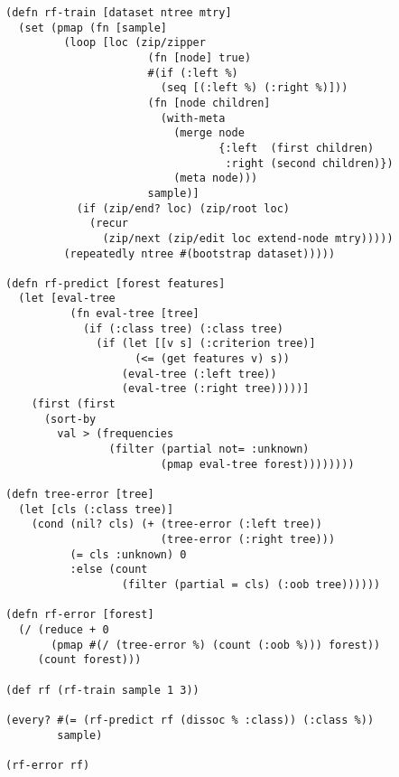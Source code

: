 \documentclass[a4paper,man,12pt,apacite,floatsintext,draftfirst]{apa6} %
\begin{document}
\begin{framed}
\begin{verbatim}
(defn rf-train [dataset ntree mtry]
  (set (pmap (fn [sample]
         (loop [loc (zip/zipper
                      (fn [node] true)
                      #(if (:left %)
                        (seq [(:left %) (:right %)]))
                      (fn [node children]
                        (with-meta
                          (merge node
                                 {:left  (first children)
                                  :right (second children)})
                          (meta node)))
                      sample)]
           (if (zip/end? loc) (zip/root loc)
             (recur
               (zip/next (zip/edit loc extend-node mtry)))))
         (repeatedly ntree #(bootstrap dataset)))))

(defn rf-predict [forest features]
  (let [eval-tree
          (fn eval-tree [tree]
            (if (:class tree) (:class tree)
              (if (let [[v s] (:criterion tree)]
                    (<= (get features v) s))
                  (eval-tree (:left tree))
                  (eval-tree (:right tree)))))]
    (first (first
      (sort-by
        val > (frequencies
                (filter (partial not= :unknown)
                        (pmap eval-tree forest))))))))

(defn tree-error [tree]
  (let [cls (:class tree)]
    (cond (nil? cls) (+ (tree-error (:left tree))
                        (tree-error (:right tree)))
          (= cls :unknown) 0
          :else (count
                  (filter (partial = cls) (:oob tree))))))

(defn rf-error [forest]
  (/ (reduce + 0
       (pmap #(/ (tree-error %) (count (:oob %))) forest))
     (count forest)))

(def rf (rf-train sample 1 3))

(every? #(= (rf-predict rf (dissoc % :class)) (:class %))
        sample)

(rf-error rf)

\end{verbatim}
\end{framed}


\end{document}
